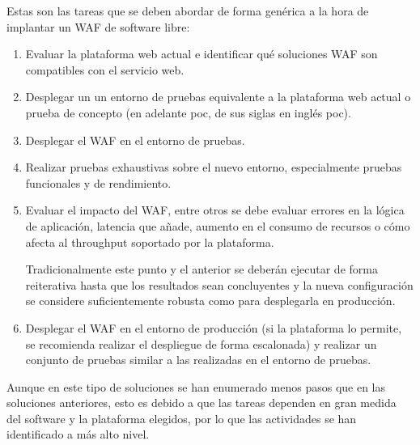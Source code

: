 \par Estas son las tareas que se deben abordar de forma genérica a la hora de implantar un WAF de software libre:
\begin{enumerate}
  \item Evaluar la plataforma web actual e identificar qué soluciones WAF son compatibles con el servicio web.
  \item Desplegar un un entorno de pruebas equivalente a la plataforma web actual o prueba de concepto (en adelante \acrshort{poc}, de sus
    siglas en inglés \acrlong{poc}).
  \item Desplegar el WAF en el entorno de pruebas.
  \item Realizar pruebas exhaustivas sobre el nuevo entorno, especialmente pruebas funcionales y de rendimiento.
  \item Evaluar el impacto del WAF, entre otros se debe evaluar errores en la lógica de aplicación, latencia que añade, aumento en el consumo
    de recursos o cómo afecta al throughput soportado por la plataforma.
    \par Tradicionalmente este punto y el anterior se deberán ejecutar de forma reiterativa hasta que los resultados sean concluyentes y la
    nueva configuración se considere suficientemente robusta como para desplegarla en producción.
  \item Desplegar el WAF en el entorno de producción (si la plataforma lo permite, se recomienda realizar el despliegue de forma escalonada) y
    realizar un conjunto de pruebas similar a las realizadas en el entorno de pruebas.
\end{enumerate}

\par Aunque en este tipo de soluciones se han enumerado menos pasos que en las soluciones anteriores, esto es debido a que las tareas dependen
en gran medida del software y la plataforma elegidos, por lo que las actividades se han identificado a más alto nivel.

